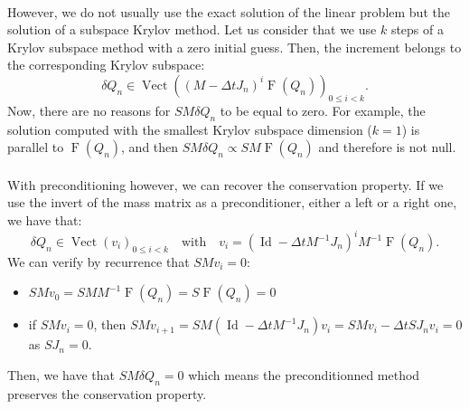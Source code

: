   \paragraph{}
  However, we do not usually use the exact solution of the linear problem but the solution of a subspace Krylov method.
  Let us consider that we use $k$ steps of a Krylov subspace method with a zero initial guess.
  Then, the increment belongs to the corresponding Krylov subspace:
  \begin{equation}
    \delta Q_n \in \operatorname{Vect}\left( \left(M - \Delta t J_n\right)^i \operatorname{F}\left(Q_n\right) \right)_{0\leq i < k} .
  \end{equation}
  Now, there are no reasons for $SM\delta Q_n$ to be equal to zero.
  For example, the solution computed with the smallest Krylov subspace dimension ($k = 1$) is parallel to $\operatorname{F}\left(Q_n\right)$, and then $SM\delta Q_n \propto SM\operatorname{F}\left(Q_n\right)$ and therefore is not null.

  \paragraph{}
  With preconditioning however, we can recover the conservation property.
  If we use the invert of the mass matrix as a preconditioner, either a left or a right one, we have that:
  \begin{equation}
    \delta Q_n \in \operatorname{Vect}\left(v_i\right)_{0\leq i < k} \quad\textrm{with}\quad v_i = \left(\operatorname{Id} - \Delta t M^{-1} J_n \right)^i M^{-1} \operatorname{F}\left(Q_n\right) .
  \end{equation}
  We can verify by recurrence that $SMv_i = 0$:
  \begin{itemize}
    \item $SMv_0 = SMM^{-1}\operatorname{F}\left(Q_n\right) = S\operatorname{F}\left(Q_n\right) = 0$
    \item if $SMv_i = 0$, then $SMv_{i+1} = SM \left(\operatorname{Id} - \Delta t M^{-1} J_n \right) v_i = SMv_i - \Delta t S J_n v_i = 0$ as $SJ_n = 0$.
  \end{itemize}
  Then, we have that $SM\delta Q_n = 0$ which means the preconditionned method preserves the conservation property.
